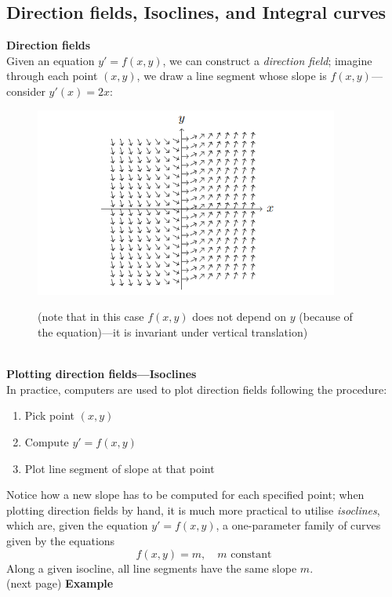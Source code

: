 \documentclass{report}
\begin{document}
\subsection{Direction fields, Isoclines, and Integral curves}%
\textbf{Direction fields}\\
Given an equation $y'=f(x,y)$, we can construct a \textit{direction field}; imagine through each point $(x,y)$, we
draw a line segment whose slope is $f(x,y)$---consider $y'(x)=2x$:
\begin{figure}[h]
\begin{center}
\includegraphics[width=10cm]{1}\\
\end{center}
(note that in this case $f(x,y)$ does not depend on $y$ (because of the equation)---it is invariant under vertical
translation)
\end{figure}\\
\textbf{Plotting direction fields---Isoclines}\\
In practice, computers are used to plot direction fields following the procedure:
\begin{enumerate}
\item Pick point $(x,y)$
\item Compute $y'=f(x,y)$
\item Plot line segment of slope at that point
\end{enumerate}
Notice how a new slope has to be computed for each specified point; when plotting direction fields by hand, 
it is much more practical to utilise \textit{isoclines}, which are, given the equation $y'=f(x,y)$, a one-parameter
family of curves given by the equations
\begin{equation*}
f(x,y)=m,\quad m\text{ constant}
\end{equation*}
Along a given isocline, all line segments have the same slope $m$.\\
(next page)
\newpage
\noindent\textbf{Example}\\
\end{document}
